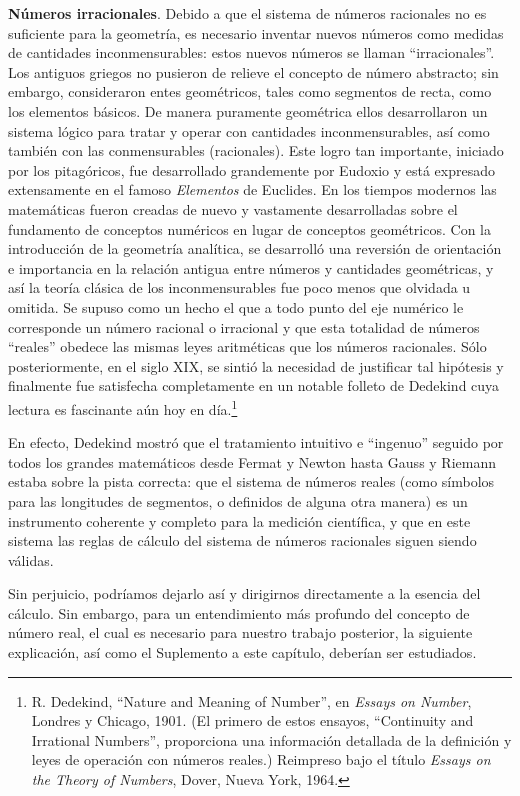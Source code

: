 \documentclass[12pt]{book}
\theoremstyle{definition}
\begin{document}
\textbf{Números irracionales}. Debido a que el sistema de números racionales no es suficiente para la geometría, es necesario inventar nuevos números como medidas de cantidades inconmensurables: estos nuevos números se llaman ``irracionales''. Los antiguos griegos no pusieron de relieve el concepto de número abstracto; sin embargo, consideraron entes geométricos, tales como segmentos de recta, como los elementos básicos. De manera puramente geométrica ellos desarrollaron un sistema lógico para tratar y operar con cantidades inconmensurables, así como también con las conmensurables (racionales). Este logro tan importante, iniciado por los pitagóricos, fue desarrollado grandemente por Eudoxio y está expresado extensamente en el famoso \textit{Elementos} de Euclides. En los tiempos modernos las matemáticas fueron creadas de nuevo y vastamente desarrolladas sobre el fundamento de conceptos numéricos en lugar de conceptos geométricos. Con la introducción de la geometría analítica, se desarrolló una reversión de orientación e importancia en la relación antigua entre números y cantidades geométricas, y así la teoría clásica de los inconmensurables fue poco menos que olvidada u omitida. Se supuso como un hecho el que a todo punto del eje numérico le corresponde un número racional o irracional y que esta totalidad de números ``reales'' obedece las mismas leyes aritméticas que los números racionales. Sólo posteriormente, en el siglo XIX, se sintió la necesidad de justificar tal hipótesis y finalmente fue satisfecha completamente en un notable folleto de Dedekind cuya lectura es fascinante aún hoy en día.\footnote{R. Dedekind, ``Nature and Meaning of Number'', en \textit{Essays on Number}, Londres y Chicago, 1901. (El primero de estos ensayos, ``Continuity and Irrational Numbers'', proporciona una información detallada de la definición y leyes de operación con números reales.) Reimpreso bajo el título \textit{Essays on the Theory of Numbers}, Dover, Nueva York, 1964.}

En efecto, Dedekind mostró que el tratamiento intuitivo e ``ingenuo'' seguido por todos los grandes matemáticos desde Fermat y Newton hasta Gauss y Riemann estaba sobre la pista correcta: que el sistema de números reales (como símbolos para las longitudes de segmentos, o definidos de alguna otra manera) es un instrumento coherente y completo para la medición científica, y que en este sistema las reglas de cálculo del sistema de números racionales siguen siendo válidas.

Sin perjuicio, podríamos dejarlo así y dirigirnos directamente a la esencia del cálculo. Sin embargo, para un entendimiento más profundo del concepto de número real, el cual es necesario para nuestro trabajo posterior, la siguiente explicación, así como el Suplemento a este capítulo, deberían ser estudiados.
\end{document}
